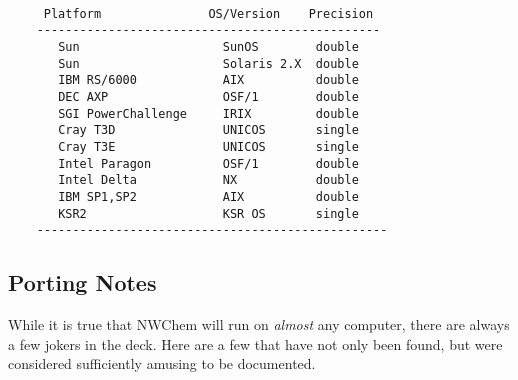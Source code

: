 \begin{verbatim}

     Platform               OS/Version    Precision
    ------------------------------------------------
       Sun                    SunOS        double
       Sun                    Solaris 2.X  double
       IBM RS/6000            AIX          double
       DEC AXP                OSF/1        double
       SGI PowerChallenge     IRIX         double
       Cray T3D               UNICOS       single
       Cray T3E               UNICOS       single
       Intel Paragon          OSF/1        double
       Intel Delta            NX           double
       IBM SP1,SP2            AIX          double
       KSR2                   KSR OS       single
    -------------------------------------------------

\end{verbatim}

\subsection{Porting Notes}
\label{sec:PortingNotes}

While it is true that NWChem will run on {\em almost} any computer, there are always
a few jokers in the deck.  Here are a few that have not only been found, but were
considered sufficiently amusing to be documented.

